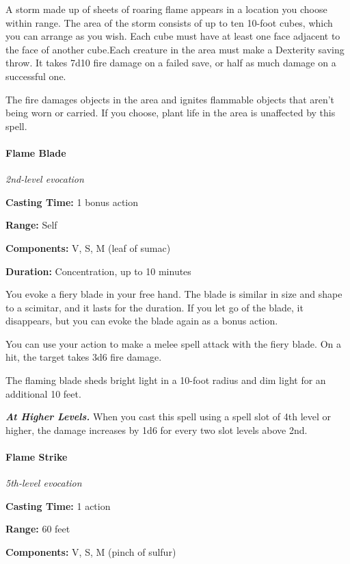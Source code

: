 \documentclass[
]{article}
\begin{document}
A storm made up of sheets of roaring flame appears in a location you
choose within range. The area of the storm consists of up to ten 10-foot
cubes, which you can arrange as you wish. Each cube must have at least
one face adjacent to the face of another cube.Each creature in the area
must make a Dexterity saving throw. It takes 7d10 fire damage on a
failed save, or half as much damage on a successful one.

The fire damages objects in the area and ignites flammable objects that
aren't being worn or carried. If you choose, plant life in the area is
unaffected by this spell.

\hypertarget{flame-blade}{%
\paragraph{Flame Blade}\label{flame-blade}}

\emph{2nd-level evocation}

\textbf{Casting Time:} 1 bonus action

\textbf{Range:} Self

\textbf{Components:} V, S, M (leaf of sumac)

\textbf{Duration:} Concentration, up to 10 minutes

You evoke a fiery blade in your free hand. The blade is similar in size
and shape to a scimitar, and it lasts for the duration. If you let go of
the blade, it disappears, but you can evoke the blade again as a bonus
action.

You can use your action to make a melee spell attack with the fiery
blade. On a hit, the target takes 3d6 fire damage.

The flaming blade sheds bright light in a 10-foot radius and dim light
for an additional 10 feet.

\emph{\textbf{At Higher Levels.}} When you cast this spell using a spell
slot of 4th level or higher, the damage increases by 1d6 for every two
slot levels above 2nd.

\hypertarget{flame-strike}{%
\paragraph{Flame Strike}\label{flame-strike}}

\emph{5th-level evocation}

\textbf{Casting Time:} 1 action

\textbf{Range:} 60 feet

\textbf{Components:} V, S, M (pinch of sulfur)
\end{document}
